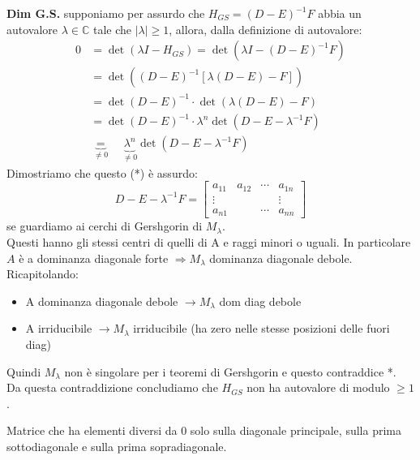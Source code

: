 \documentclass[12pt,a4paper,]{report}
\begin{document}
\begin{dimostrazione}
    \medskip
    \noindent
    \textbf{Dim G.S.} supponiamo per assurdo che $H_{GS} = (D - E)^{-1} F$ abbia un autovalore $\lambda \in \mathbb{C}$ tale che $|\lambda| \geq 1$, allora, dalla definizione di autovalore:
    \begin{align*}
        0 &= \det(\lambda I - H_{GS}) = \det\left(\lambda I - (D-E)^{-1}F\right) \\
        &= \det\left((D-E)^{-1}\left[\lambda(D-E) - F\right]\right) \\
        &= \det(D-E)^{-1} \cdot \det\left(\lambda(D-E) - F\right) \\
        &= \det(D-E)^{-1} \cdot \lambda^n \det\left(D - E - \lambda^{-1}F\right) \\
        &\underbrace{=}_{\neq 0} \quad \underbrace{\lambda^n}_{\neq 0} \det\left(D - E - \lambda^{-1}F\right)
    \end{align*}
    \noindent
    Dimostriamo che questo (*) è assurdo:
    \[
    D - E - \lambda^{-1}F = \begin{bmatrix}
        a_{11} & a_{12} & \cdots & a_{1n} \\
        \vdots & & & \vdots \\
        a_{n1} & & \cdots & a_{nn}
    \end{bmatrix}
    \]
    se guardiamo ai cerchi di Gershgorin di $M_\lambda$.\\
    Questi hanno gli stessi centri di quelli di A e raggi minori o uguali. In particolare $A$ è a dominanza diagonale forte  $\Rightarrow M_\lambda$ dominanza diagonale debole.\\
    Ricapitolando:
    \begin{itemize}
        \item A dominanza diagonale debole $\to M_\lambda$ dom diag debole
        \item A irriducibile $\to M_\lambda$ irriducibile (ha zero nelle stesse posizioni delle fuori diag)
    \end{itemize}
    Quindi $M_\lambda$ non è singolare per i teoremi di Gershgorin e questo contraddice *.\\
    Da questa contraddizione concludiamo che $H_{GS}$ non ha autovalore di modulo $\geq 1$.
\end{dimostrazione}
    
\begin{definizione}
    Matrice che ha elementi diversi da 0 solo sulla diagonale principale, sulla prima sottodiagonale e sulla prima sopradiagonale.
\end{definizione}
\end{document}
